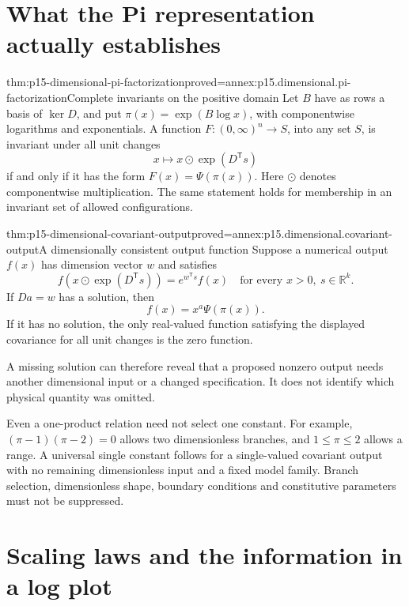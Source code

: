 \section{What the Pi representation actually establishes}
\label{sec:p15-dimensional-pi}

\begin{hbtheorem}{thm:p15-dimensional-pi-factorization}{proved=annex:p15.dimensional.pi-factorization}{Complete invariants on the positive domain}
Let \(B\) have as rows a basis of \(\ker D\), and put
\(\pi(x)=\exp(B\log x)\), with componentwise logarithms and exponentials.
A function \(F:(0,\infty)^n\to S\), into any set \(S\), is invariant under
all unit changes
\[
 x\longmapsto x\odot\exp(D^{\mathsf T}s)
\]
if and only if it has the form \(F(x)=\Psi(\pi(x))\).
Here \(\odot\) denotes componentwise multiplication.
The same statement holds for membership in an invariant set of allowed
configurations.
\end{hbtheorem}

\begin{hbtheorem}{thm:p15-dimensional-covariant-output}{proved=annex:p15.dimensional.covariant-output}{A dimensionally consistent output function}
Suppose a numerical output \(f(x)\) has dimension vector \(w\) and satisfies
\[
 f(x\odot\exp(D^{\mathsf T}s))=e^{w^{\mathsf T}s}f(x)
 \quad\text{for every }x>0,\ s\in\mathbb R^k.
\]
If \(Da=w\) has a solution, then
\[
 f(x)=x^a\Psi(\pi(x)).
\]
If it has no solution, the only real-valued function satisfying the displayed
covariance for all unit changes is the zero function.
\end{hbtheorem}

A missing solution can therefore reveal that a proposed nonzero output needs
another dimensional input or a changed specification. It does not identify
which physical quantity was omitted.

Even a one-product relation need not select one constant. For example,
\((\pi-1)(\pi-2)=0\) allows two dimensionless branches, and
\(1\leq\pi\leq2\) allows a range. A universal single constant follows for
a single-valued covariant output with no remaining dimensionless input
and a fixed model family. Branch selection, dimensionless shape, boundary
conditions and constitutive parameters must not be suppressed.

\section{Scaling laws and the information in a log plot}
\label{sec:p15-dimensional-scaling}

